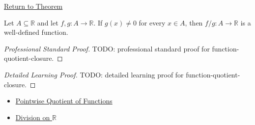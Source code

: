 \newpage
{}
\label{prf:function-quotient-closure}

\begin{remark*}[Return]
\hyperref[thm:function-quotient-closure]{Return to Theorem}
\end{remark*}

\begin{theorem*}
Let \(A\subseteq\mathbb{R}\) and let \(f,g:A\to\mathbb{R}\).  If
\(g(x)\neq0\) for every \(x\in A\), then \(f/g:A\to\mathbb{R}\) is a
well-defined function.
\end{theorem*}

\begin{proof}[Professional Standard Proof]
\LRAProofBodyStart
TODO: professional standard proof for function-quotient-closure.
\end{proof}

\begin{proof}[Detailed Learning Proof]
\LRAProofBodyStart
TODO: detailed learning proof for function-quotient-closure.
\end{proof}

\begin{remark*}
\end{remark*}

\begin{dependencies}
\begin{itemize}
  \item \hyperref[def:pointwise-quotient-of-functions]{Pointwise Quotient of Functions}
  \item \hyperref[def:division-on-r]{Division on \(\mathbb{R}\)}
\end{itemize}
\end{dependencies}

\clearpage
